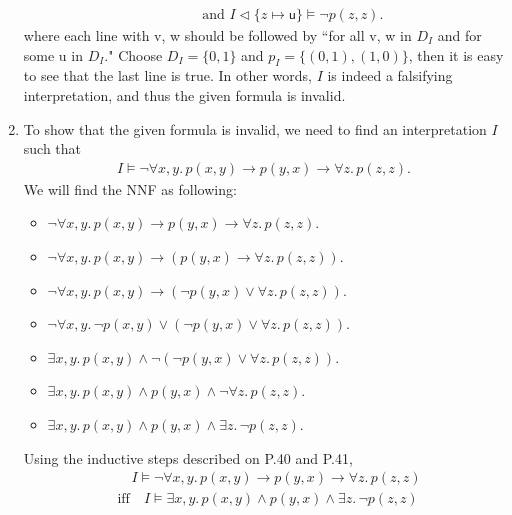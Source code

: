 \begin{exer}[2.2]
\begin{enumerate}[label=(\alph*)]
\begin{align*}
                                    &\quad \quad \quad \text{ and } I \vartriangleleft \{ z \mapsto \textsf{u} \} \models \neg p(z, z).
            \end{align*}
            where each line with \textsf{v}, \textsf{w} should be followed by ``for all \textsf{v}, \textsf{w} in $D_I$ and for some \textsf{u} in $D_I$."
            Choose $D_I = \{ 0, 1 \}$ and $p_I = \{ (0, 1), (1, 0) \}$, then it is easy to see that the last line is true.
            In other words, $I$ is indeed a falsifying interpretation, and thus the given formula is invalid.
        \item %
            To show that the given formula is invalid, we need to find an interpretation $I$ such that
            \begin{align*}
                I \models \neg\forall x, y.\, p(x, y) \rightarrow p(y, x) \rightarrow \forall z.\, p(z, z).
            \end{align*}
            We will find the NNF as following:
            \begin{itemize}
                \item
                    $\neg\forall x, y.\, p(x, y) \rightarrow p(y, x) \rightarrow \forall z.\, p(z, z)$.
                \item
                    $\neg\forall x, y.\, p(x, y) \rightarrow (p(y, x) \rightarrow \forall z.\, p(z, z))$.
                \item
                    $\neg\forall x, y.\, p(x, y) \rightarrow (\neg p(y, x) \lor \forall z.\, p(z, z))$.
                \item
                    $\neg\forall x, y.\, \neg p(x, y) \lor (\neg p(y, x) \lor \forall z.\, p(z, z))$.
                \item
                    $\exists x, y.\, p(x, y) \land \neg(\neg p(y, x) \lor \forall z.\, p(z, z))$.
                \item
                    $\exists x, y.\, p(x, y) \land p(y, x) \land \neg\forall z.\, p(z, z)$.
                \item
                    $\exists x, y.\, p(x, y) \land p(y, x) \land \exists z.\, \neg p(z, z)$.
            \end{itemize}
            Using the inductive steps described on P.40 and P.41,
            \begin{align*}
                &\quad I \models \neg\forall x, y.\, p(x, y) \rightarrow p(y, x) \rightarrow \forall z.\, p(z, z) \\
                    &\text{iff}\quad I \models \exists x, y.\, p(x, y) \land p(y, x) \land \exists z.\, \neg p(z, z) \\

\end{align*}
\end{enumerate}
\end{exer}
